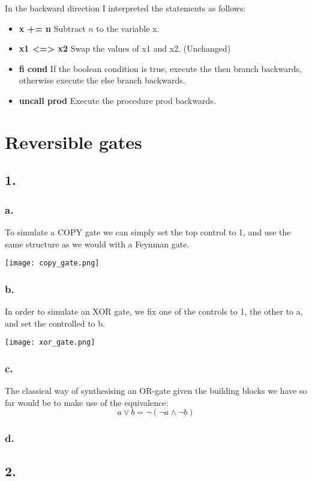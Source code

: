 \documentclass[12pt]{report}
\begin{document}
In the backward direction I interpreted the statements as follows:
\begin{itemize}
\item \textbf{ x += n } Subtract $n$ to the variable x.
\item \textbf{ x1 <=> x2 } Swap the values of x1 and x2. (Unchanged)
\item \textbf{ fi cond } If the boolean condition is true, execute the then branch backwards, otherwise execute the else branch backwards.
\item \textbf{ uncall prod } Execute the procedure prod backwards.
\end{itemize}

\section*{Reversible gates}
\subsection*{1.}
  \subsubsection*{a.}
    To simulate a COPY gate we can simply set the top control to 1, and use the same structure as we would with a Feynman gate.

    \texttt{[image: copy\_gate.png]}
  \subsubsection*{b.}
    In order to simulate an XOR gate, we fix one of the controls to 1, the other to a, and set the controlled to b.

    \texttt{[image: xor\_gate.png]}
  \subsubsection*{c.}
    The classical way of synthesising an OR-gate given the building blocks we have so far would be to make use of the equivalence:
    $$ a \lor b = \neg ( \neg a \land \neg b) $$
  \subsubsection*{d.}


\subsection*{2.}
\end{document}
